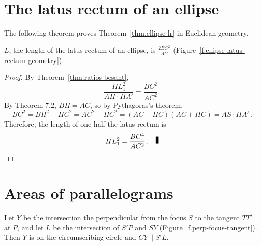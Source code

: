 
\section{The latus rectum of an ellipse}

The following theorem proves Theorem~\ref{thm.ellipse-lr} in Euclidean geometry.
\begin{theorem}\label{thm.ellipse-lr-besant}
$L$, the length of the latus rectum of an ellipse, is 
$\displaystyle\frac{2BC^2}{AC}$ (Figure~\ref{f.ellipse-latus-rectum-geometry}).
\end{theorem}
\begin{proof}
By Theorem~\ref{thm.ratios-besant},
\[
\frac{HL_1^2}{AH\cdot HA'}=\frac{BC^2}{AC^2}\,.
\]
By Theorem 7.2, $BH=AC$, so by Pythagoras's theorem,
\[
BC^2=BH^2-HC^2=AC^2-HC^2=(AC-HC)(AC+HC)=AS\cdot HA'\,.
\]
Therefore, the length of one-half the latus rectum is
\[
HL_1^2=\frac{BC^4}{AC^2}\,.\fqed
\]%
\end{proof}


\section{Areas of parallelograms}

\begin{theorem}\label{thm.perp-tangent}
Let $Y$ be the intersection the perpendicular from the focus $S$ to the tangent $TT'$ at $P$, and let $L$ be the intersection of $S'P$ and $SY$ (Figure~\ref{f.perp-focus-tangent}). Then $Y$ is on the circumscribing circle and $CY\parallel S'L$.
\end{theorem}


